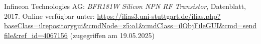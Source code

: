 
\begin{thebibliography}{1}
Infineon Technologies AG: \emph{BFR181W Silicon NPN RF Transistor}, Datenblatt, 2017. Online verfügbar unter: \url{https://ilias3.uni-stuttgart.de/ilias.php?baseClass=ilrepositorygui&cmdNode=z5:o1&cmdClass=ilObjFileGUI&cmd=sendfile&ref_id=4067156} (zugegriffen am 19.05.2025)
\end{thebibliography}
\clearpage
